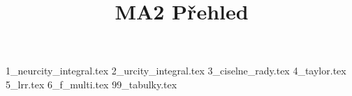 \documentclass[a4paper]{article}
\begin{document}
\title{MA2 Přehled}

\maketitle
\pagebreak

{1_neurcity_integral.tex}
{2_urcity_integral.tex}
{3_ciselne_rady.tex}
{4_taylor.tex}
{5_lrr.tex}
{6_f_multi.tex}
{99_tabulky.tex}
\end{document}
